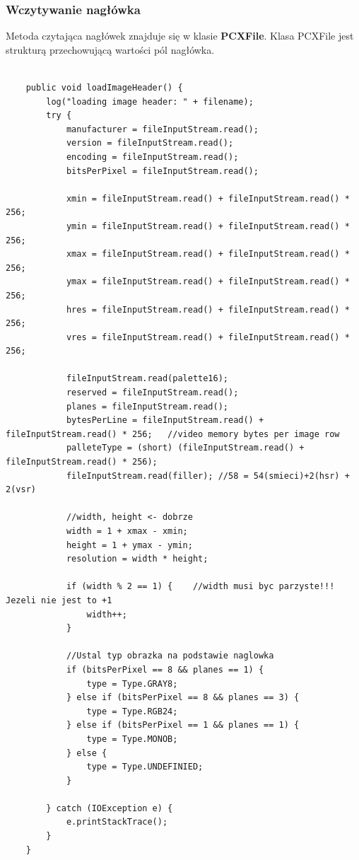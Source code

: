 \documentclass{article}
\begin{document}
\subsubsection{Wczytywanie nagłówka}
Metoda czytająca nagłówek znajduje się w klasie \textbf{PCXFile}. Klasa PCXFile jest strukturą przechowującą wartości pól nagłówka.
\begin{verbatim}
 
    public void loadImageHeader() {
        log("loading image header: " + filename);
        try {
            manufacturer = fileInputStream.read();
            version = fileInputStream.read();
            encoding = fileInputStream.read();
            bitsPerPixel = fileInputStream.read();
            
            xmin = fileInputStream.read() + fileInputStream.read() * 256;            
            ymin = fileInputStream.read() + fileInputStream.read() * 256;
            xmax = fileInputStream.read() + fileInputStream.read() * 256;
            ymax = fileInputStream.read() + fileInputStream.read() * 256;
            hres = fileInputStream.read() + fileInputStream.read() * 256;
            vres = fileInputStream.read() + fileInputStream.read() * 256;
            
            fileInputStream.read(palette16);
            reserved = fileInputStream.read();
            planes = fileInputStream.read();
            bytesPerLine = fileInputStream.read() + fileInputStream.read() * 256;   //video memory bytes per image row
            palleteType = (short) (fileInputStream.read() + fileInputStream.read() * 256);
            fileInputStream.read(filler); //58 = 54(smieci)+2(hsr) + 2(vsr)

            //width, height <- dobrze
            width = 1 + xmax - xmin;
            height = 1 + ymax - ymin;
            resolution = width * height;
            
            if (width % 2 == 1) {    //width musi byc parzyste!!! Jezeli nie jest to +1
                width++;
            }

            //Ustal typ obrazka na podstawie naglowka
            if (bitsPerPixel == 8 && planes == 1) {
                type = Type.GRAY8;
            } else if (bitsPerPixel == 8 && planes == 3) {
                type = Type.RGB24;
            } else if (bitsPerPixel == 1 && planes == 1) {
                type = Type.MONOB;
            } else {
                type = Type.UNDEFINIED;
            }
            
        } catch (IOException e) {
            e.printStackTrace();
        }
    }
\end{verbatim}
\end{document}
